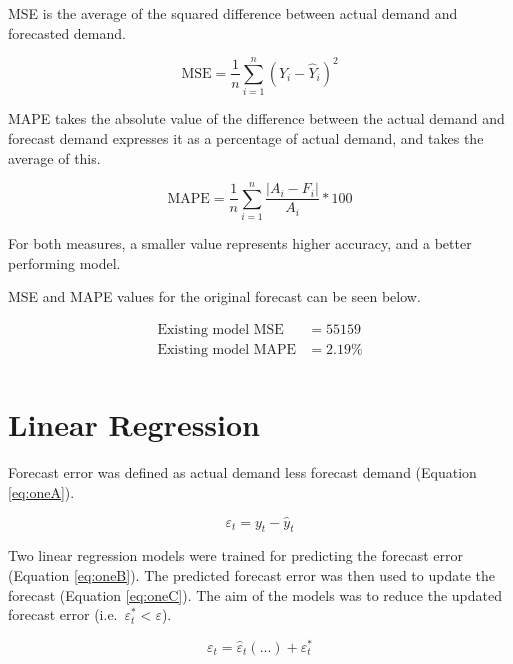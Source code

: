 \documentclass[mstat,12pt]{unswthesis}
\begin{document}
\bigskip

MSE is the average of the squared difference between actual demand and forecasted demand.

\begin{equation*}
\text{MSE} = \frac{1}{n}\sum^{n}_{i=1}{(Y_i-{\hat{Y}_{i}})^2}
\end{equation*}

MAPE takes the absolute value of the difference between the actual demand and forecast demand expresses it as a percentage of actual demand, and takes the average of this.

\begin{equation*}
\text{MAPE} = \frac{1}{n}\sum^{n}_{i=1}{\frac{\lvert A_{i}-F_{i}\rvert}{A_{i}} * 100}
\end{equation*}

For both measures, a smaller value represents higher accuracy, and a better performing model.

\bigskip

MSE and MAPE values for the original forecast can be seen below.

\begin{align*}
\text{Existing model MSE} &= 55159 \\
\text{Existing model MAPE} &= 2.19\% \\
\end{align*}

\section{Linear Regression}\label{linear-regression}

Forecast error was defined as actual demand less forecast demand (Equation \eqref{eq:oneA}).

\begin{equation}
\varepsilon_t = y_t - \hat{y}_{t} \label{eq:oneA}
\end{equation}

Two linear regression models were trained for predicting the forecast error (Equation \eqref{eq:oneB}). The predicted forecast error was then used to update the forecast (Equation \eqref{eq:oneC}). The aim of the models was to reduce the updated forecast error (i.e.~\(\varepsilon^{*}_t < \varepsilon\)).

\begin{equation}
\varepsilon_t = \hat{\varepsilon}_t(...) + \varepsilon^{*}_t \label{eq:oneB}
\end{equation}
\end{document}
